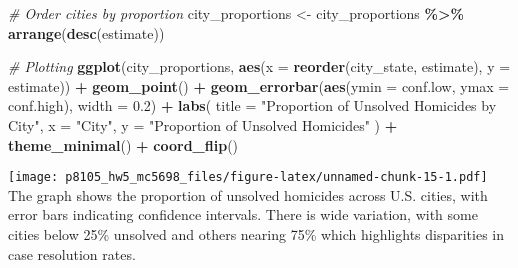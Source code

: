 \documentclass[
]{article}
\newenvironment{Shaded}{\begin{snugshade}}{\end{snugshade}}
\newcommand{\AttributeTok}[1]{\textcolor[rgb]{0.13,0.29,0.53}{#1}}
\newcommand{\CommentTok}[1]{\textcolor[rgb]{0.56,0.35,0.01}{\textit{#1}}}
\newcommand{\FloatTok}[1]{\textcolor[rgb]{0.00,0.00,0.81}{#1}}
\newcommand{\FunctionTok}[1]{\textcolor[rgb]{0.13,0.29,0.53}{\textbf{#1}}}
\newcommand{\NormalTok}[1]{#1}
\newcommand{\OtherTok}[1]{\textcolor[rgb]{0.56,0.35,0.01}{#1}}
\newcommand{\SpecialCharTok}[1]{\textcolor[rgb]{0.81,0.36,0.00}{\textbf{#1}}}
\newcommand{\StringTok}[1]{\textcolor[rgb]{0.31,0.60,0.02}{#1}}
\begin{document}
\begin{Shaded}
\begin{Highlighting}[]
\CommentTok{\# Order cities by proportion}
\NormalTok{city\_proportions }\OtherTok{\textless{}{-}}\NormalTok{ city\_proportions }\SpecialCharTok{\%\textgreater{}\%}
  \FunctionTok{arrange}\NormalTok{(}\FunctionTok{desc}\NormalTok{(estimate))}

\CommentTok{\# Plotting}
\FunctionTok{ggplot}\NormalTok{(city\_proportions, }\FunctionTok{aes}\NormalTok{(}\AttributeTok{x =} \FunctionTok{reorder}\NormalTok{(city\_state, estimate), }\AttributeTok{y =}\NormalTok{ estimate)) }\SpecialCharTok{+}
  \FunctionTok{geom\_point}\NormalTok{() }\SpecialCharTok{+}
  \FunctionTok{geom\_errorbar}\NormalTok{(}\FunctionTok{aes}\NormalTok{(}\AttributeTok{ymin =}\NormalTok{ conf.low, }\AttributeTok{ymax =}\NormalTok{ conf.high), }\AttributeTok{width =} \FloatTok{0.2}\NormalTok{) }\SpecialCharTok{+}
  \FunctionTok{labs}\NormalTok{(}
    \AttributeTok{title =} \StringTok{"Proportion of Unsolved Homicides by City"}\NormalTok{,}
    \AttributeTok{x =} \StringTok{"City"}\NormalTok{,}
    \AttributeTok{y =} \StringTok{"Proportion of Unsolved Homicides"}
\NormalTok{  ) }\SpecialCharTok{+}
  \FunctionTok{theme\_minimal}\NormalTok{() }\SpecialCharTok{+}
  \FunctionTok{coord\_flip}\NormalTok{()}
\end{Highlighting}
\end{Shaded}

\texttt{[image: p8105\_hw5\_mc5698\_files/figure-latex/unnamed-chunk-15-1.pdf]}
The graph shows the proportion of unsolved homicides across U.S. cities,
with error bars indicating confidence intervals. There is wide
variation, with some cities below 25\% unsolved and others nearing 75\%
which highlights disparities in case resolution rates.
\end{document}
